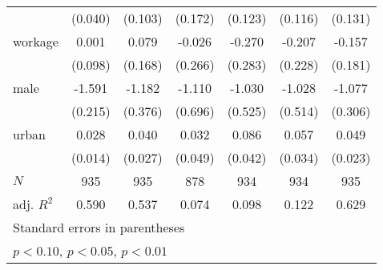 {\begin{tabular}{l*{6}{c}}
            &     (0.040)         &     (0.103)         &     (0.172)         &     (0.123)         &     (0.116)         &     (0.131)         \\
[1em]
workage     &       0.001         &       0.079         &      -0.026         &      -0.270         &      -0.207         &      -0.157         \\
            &     (0.098)         &     (0.168)         &     (0.266)         &     (0.283)         &     (0.228)         &     (0.181)         \\
[1em]
male        &      -1.591\sym{***}&      -1.182\sym{***}&      -1.110         &      -1.030\sym{*}  &      -1.028\sym{*}  &      -1.077\sym{***}\\
            &     (0.215)         &     (0.376)         &     (0.696)         &     (0.525)         &     (0.514)         &     (0.306)         \\
[1em]
urban       &       0.028\sym{*}  &       0.040         &       0.032         &       0.086\sym{*}  &       0.057         &       0.049\sym{**} \\
            &     (0.014)         &     (0.027)         &     (0.049)         &     (0.042)         &     (0.034)         &     (0.023)         \\
\hline
\(N\)       &         935         &         935         &         878         &         934         &         934         &         935         \\
adj. \(R^{2}\)&       0.590         &       0.537         &       0.074         &       0.098         &       0.122         &       0.629         \\
\hline\hline
\multicolumn{7}{l}{\footnotesize Standard errors in parentheses}\\
\multicolumn{7}{l}{\footnotesize \sym{*} \(p<0.10\), \sym{**} \(p<0.05\), \sym{***} \(p<0.01\)}\\
\end{tabular}
}
